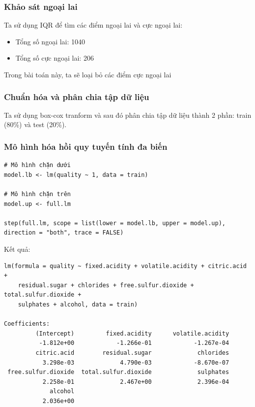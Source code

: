 \subsubsection{Khảo sát ngoại lai}

Ta sử dụng IQR để tìm các điểm ngoại lai và cực ngoại lai:
\begin{itemize}
    \item Tổng số ngoại lai: 1040
    \item Tổng số cực ngoại lai: 206
\end{itemize}
Trong bài toán này, ta sẽ loại bỏ các điểm cực ngoại lai

\subsubsection{Chuẩn hóa và phân chia tập dữ liệu}

Ta sử dụng box-cox tranform và sau đó phân chia tập dữ liệu thành 2 phần: train (80\%) và test (20\%).

\subsubsection{Mô hình hóa hồi quy tuyến tính đa biến}

\begin{lstlisting}
# Mô hình chặn dưới
model.lb <- lm(quality ~ 1, data = train)

# Mô hình chặn trên
model.up <- full.lm

step(full.lm, scope = list(lower = model.lb, upper = model.up), direction = "both", trace = FALSE)
\end{lstlisting}
Kết quả:
\begin{lstlisting}
lm(formula = quality ~ fixed.acidity + volatile.acidity + citric.acid + 
    residual.sugar + chlorides + free.sulfur.dioxide + total.sulfur.dioxide + 
    sulphates + alcohol, data = train)

Coefficients:
         (Intercept)         fixed.acidity      volatile.acidity  
          -1.812e+00            -1.266e-01            -1.267e-04  
         citric.acid        residual.sugar             chlorides  
           3.298e-03             4.790e-03            -8.670e-07  
 free.sulfur.dioxide  total.sulfur.dioxide             sulphates  
           2.258e-01             2.467e+00             2.396e-04  
             alcohol  
           2.036e+00  
\end{lstlisting}

